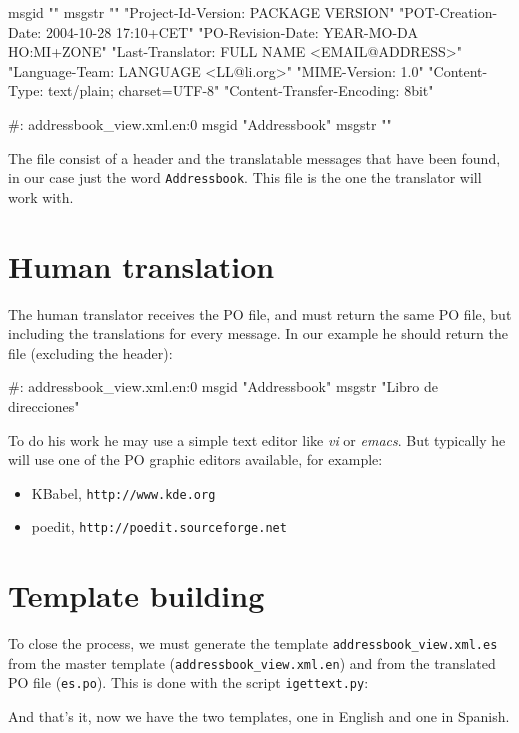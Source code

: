 \begin{code}
    msgid ""
    msgstr ""
    "Project-Id-Version: PACKAGE VERSION\n"
    "POT-Creation-Date: 2004-10-28 17:10+CET\n"
    "PO-Revision-Date: YEAR-MO-DA HO:MI+ZONE\n"
    "Last-Translator: FULL NAME <EMAIL@ADDRESS>\n"
    "Language-Team: LANGUAGE <LL@li.org>\n"
    "MIME-Version: 1.0\n"
    "Content-Type: text/plain; charset=UTF-8\n"
    "Content-Transfer-Encoding: 8bit\n"

    #: addressbook_view.xml.en:0
    msgid "Addressbook"
    msgstr ""
\end{code}

The file consist of a header and the translatable messages that have been
found, in our case just the word {\tt Addressbook}. This file is the one
the translator will work with.


\section{Human translation}

The human translator receives the PO file, and must return the same PO
file, but including the translations for every message. In our example
he should return the file (excluding the header):

\begin{code}
    #: addressbook_view.xml.en:0
    msgid "Addressbook"
    msgstr "Libro de direcciones"
\end{code}

To do his work he may use a simple text editor like {\em vi} or {\em emacs}.
But typically he will use one of the PO graphic editors available, for
example:

\begin{itemize}
  \item KBabel, {\tt http://www.kde.org}
  \item poedit, {\tt http://poedit.sourceforge.net}
\end{itemize}


\section{Template building}

To close the process, we must generate the template
{\tt addressbook\_view.xml.es} from the master template
({\tt addressbook\_view.xml.en}) and from the translated PO file ({\tt es.po}).
This is done with the script {\tt igettext.py}:


And that's it, now we have the two templates, one in English and one in
Spanish.


